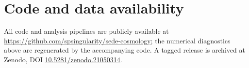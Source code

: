 \documentclass[11pt,a4paper]{article}
\begin{document}
\section*{Code and data availability}\label{code-and-data-availability}

All code and analysis pipelines are publicly available at
\url{https://github.com/spsingularity/sede-cosmology}; the numerical
diagnostics above are regenerated by the accompanying code. A tagged
release is archived at Zenodo, DOI
\href{https://doi.org/10.5281/zenodo.21050314}{10.5281/zenodo.21050314}.


\end{document}
